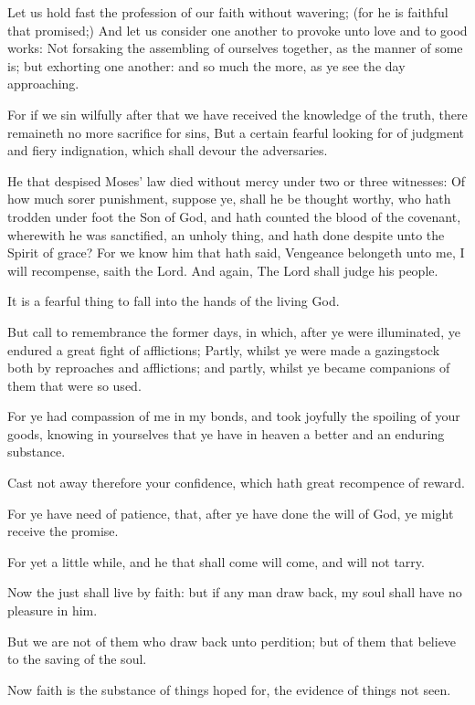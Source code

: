 \Verse Let us hold fast the profession of our faith without wavering; (for he is faithful that promised;) \Verse And let us consider one another to provoke unto love and to good works: \Verse Not forsaking the assembling of ourselves together, as the manner of some is; but exhorting one another: and so much the more, as ye see the day approaching.

\Verse For if we sin wilfully after that we have received the knowledge of the truth, there remaineth no more sacrifice for sins, \Verse But a certain fearful looking for of judgment and fiery indignation, which shall devour the adversaries.

\Verse He that despised Moses' law died without mercy under two or three witnesses: \Verse Of how much sorer punishment, suppose ye, shall he be thought worthy, who hath trodden under foot the Son of God, and hath counted the blood of the covenant, wherewith he was sanctified, an unholy thing, and hath done despite unto the Spirit of grace?  \Verse For we know him that hath said, Vengeance belongeth unto me, I will recompense, saith the Lord. And again, The Lord shall judge his people.

\Verse It is a fearful thing to fall into the hands of the living God.

\Verse But call to remembrance the former days, in which, after ye were illuminated, ye endured a great fight of afflictions; \Verse Partly, whilst ye were made a gazingstock both by reproaches and afflictions; and partly, whilst ye became companions of them that were so used.

\Verse For ye had compassion of me in my bonds, and took joyfully the spoiling of your goods, knowing in yourselves that ye have in heaven a better and an enduring substance.

\Verse Cast not away therefore your confidence, which hath great recompence of reward.

\Verse For ye have need of patience, that, after ye have done the will of God, ye might receive the promise.

\Verse For yet a little while, and he that shall come will come, and will not tarry.

\Verse Now the just shall live by faith: but if any man draw back, my soul shall have no pleasure in him.

\Verse But we are not of them who draw back unto perdition; but of them that believe to the saving of the soul.


\Chapter
\Verse Now faith is the substance of things hoped for, the evidence of things not seen.

